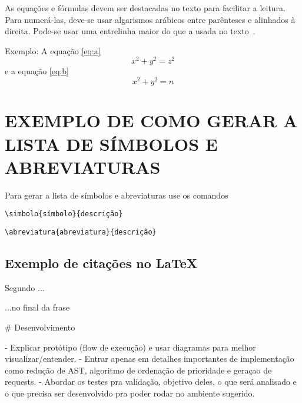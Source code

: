 As equações e fórmulas
devem ser destacadas no texto
para facilitar a leitura.
Para numerá-las,
deve-se usar algarismos arábicos entre parênteses
e alinhados à direita.
Pode-se usar uma entrelinha maior do que a usada no texto~\cite{abnt14724}.

Exemplo: A equação \ref{eq:a}
\begin{equation}
    x^2 + y^2 = z^2
    \label{eq:a}
\end{equation}
 e a equação \ref{eq:b}
\begin{equation}
    x^2 + y^2 = n
    \label{eq:b}
\end{equation}

\section{EXEMPLO DE COMO GERAR A LISTA DE SÍMBOLOS E ABREVIATURAS}

Para gerar a lista de símbolos e abreviaturas use os comandos


\begin{lstlisting}
\simbolo{símbolo}{descrição}
\end{lstlisting}

\begin{lstlisting}
\abreviatura{abreviatura}{descrição}
\end{lstlisting}

\subsection{Exemplo de citações no \LaTeX}

Segundo  ...

...no final da frase \cite{abnt14724,BU_formatoA5}

\nocite{alves_2001,abnt10520,abnt6024,abnt14724}


# Desenvolvimento

- Explicar protótipo (flow de execução) e usar diagramas para melhor visualizar/entender.
- Entrar apenas em detalhes importantes de implementação como redução de AST, algoritmo de ordenação de prioridade e geraçao de requests.
- Abordar os testes pra validação, objetivo deles, o que será analisado e o que precisa ser desenvolvido pra poder rodar no ambiente sugerido.
